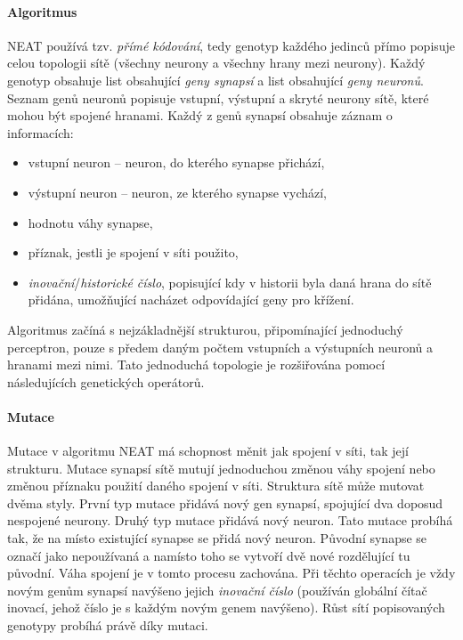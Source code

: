 \paragraph{Algoritmus}
NEAT používá tzv. \emph{přímé kódování}, tedy genotyp každého jedinců přímo
popisuje celou topologii sítě (všechny neurony a všechny hrany mezi neurony).
Každý genotyp obsahuje list obsahující \emph{geny synapsí} a list obsahující
\emph{geny neuronů}. Seznam genů neuronů popisuje vstupní, výstupní a skryté
neurony sítě, které mohou být spojené hranami. Každý z genů synapsí obsahuje
záznam o informacích:
\begin{itemize}
    \item vstupní neuron -- neuron, do kterého synapse přichází,
    \item výstupní neuron -- neuron, ze kterého synapse vychází,
    \item hodnotu váhy synapse,
    \item příznak, jestli je spojení v síti použito,
    \item \emph{inovační}/\emph{historické číslo}, popisující kdy v historii
        byla daná hrana do sítě přidána, umožňující nacházet
        odpovídající geny pro křížení.
\end{itemize}
Algoritmus začíná s nejzákladnější strukturou, připomínající jednoduchý
perceptron, pouze s předem daným počtem vstupních a výstupních neuronů a
hranami mezi nimi. Tato jednoduchá topologie je rozšiřována pomocí
následujících genetických operátorů.

\paragraph{Mutace}
Mutace v algoritmu NEAT má schopnost měnit jak spojení v síti, tak její
strukturu. Mutace synapsí sítě mutují jednoduchou změnou váhy spojení nebo
změnou příznaku použití daného spojení v síti. Struktura sítě může mutovat
dvěma styly. První typ mutace přidává nový gen synapsí, spojující dva doposud
nespojené neurony. Druhý typ mutace přidává nový neuron. Tato mutace probíhá
tak, že na místo existující synapse se přidá nový neuron. Původní synapse se
označí jako nepoužívaná a namísto toho se vytvoří dvě nové rozdělující tu
původní. Váha spojení je v tomto procesu zachována. Při těchto operacích je
vždy novým genům synapsí navýšeno jejich \emph{inovační číslo} (používán
globální čítač inovací, jehož číslo je s každým novým genem navýšeno). Růst
sítí popisovaných genotypy probíhá právě díky mutaci.

